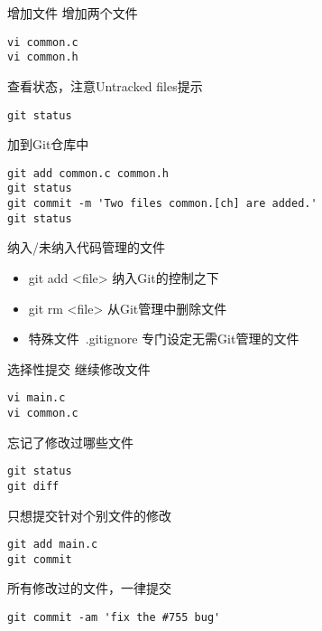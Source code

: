 \begin{frame}[<+->][fragile]{增加文件}
\onslide<+->
增加两个文件
\begin{Verbatim}[frame=single,commandchars=\\\{\}]
vi common.c
vi common.h
\end{Verbatim}

\onslide<+->
查看状态，注意Untracked files提示
\begin{Verbatim}[frame=single,commandchars=\\\{\}]
git status
\end{Verbatim}

\onslide<+->
加到Git仓库中
\begin{Verbatim}[frame=single,commandchars=\\\{\}]
git add common.c common.h
git status
git commit -m 'Two files common.[ch] are added.'
git status
\end{Verbatim}
\end{frame}

\begin{frame}[<+->]{纳入/未纳入代码管理的文件}
  \begin{itemize}
    \item git add <file> 纳入Git的控制之下
    \item git rm <file> 从Git管理中删除文件
    \item 特殊文件\  .gitignore 专门设定无需Git管理的文件
  \end{itemize}
\end{frame}

\begin{frame}[<+->][fragile]{选择性提交}
\onslide<+->
继续修改文件
\begin{Verbatim}[frame=single,commandchars=\\\{\}]
vi main.c
vi common.c
\end{Verbatim}

\onslide<+->
忘记了修改过哪些文件
\begin{Verbatim}[frame=single,commandchars=\\\{\}]
git status
git diff
\end{Verbatim}

\onslide<+->
只想提交针对个别文件的修改
\begin{Verbatim}[frame=single,commandchars=\\\{\}]
git add main.c
git commit
\end{Verbatim}

\onslide<+->
所有修改过的文件，一律提交
\begin{Verbatim}[frame=single,commandchars=\\\{\}]
git commit -am 'fix the #755 bug'
\end{Verbatim}
\end{frame}

